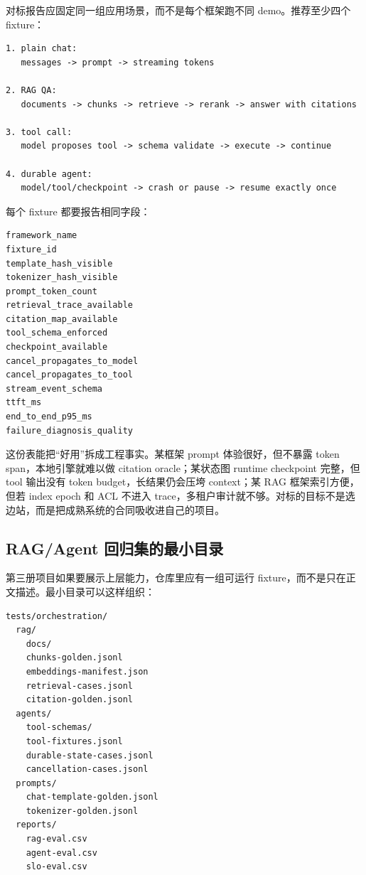 对标报告应固定同一组应用场景，而不是每个框架跑不同 demo。推荐至少四个 fixture：

\begin{lstlisting}[numbers=none,caption={上层框架对标 fixture}]
1. plain chat:
   messages -> prompt -> streaming tokens

2. RAG QA:
   documents -> chunks -> retrieve -> rerank -> answer with citations

3. tool call:
   model proposes tool -> schema validate -> execute -> continue

4. durable agent:
   model/tool/checkpoint -> crash or pause -> resume exactly once
\end{lstlisting}

每个 fixture 都要报告相同字段：

\begin{lstlisting}[numbers=none,caption={UpperFrameworkComparisonReport}]
framework_name
fixture_id
template_hash_visible
tokenizer_hash_visible
prompt_token_count
retrieval_trace_available
citation_map_available
tool_schema_enforced
checkpoint_available
cancel_propagates_to_model
cancel_propagates_to_tool
stream_event_schema
ttft_ms
end_to_end_p95_ms
failure_diagnosis_quality
\end{lstlisting}

这份表能把“好用”拆成工程事实。某框架 prompt 体验很好，但不暴露 token span，本地引擎就难以做 citation oracle；某状态图 runtime checkpoint 完整，但 tool 输出没有 token budget，长结果仍会压垮 context；某 RAG 框架索引方便，但若 index epoch 和 ACL 不进入 trace，多租户审计就不够。对标的目标不是选边站，而是把成熟系统的合同吸收进自己的项目。

\subsection{RAG/Agent 回归集的最小目录}

第三册项目如果要展示上层能力，仓库里应有一组可运行 fixture，而不是只在正文描述。最小目录可以这样组织：

\begin{lstlisting}[numbers=none,caption={上层回归集目录结构}]
tests/orchestration/
  rag/
    docs/
    chunks-golden.jsonl
    embeddings-manifest.json
    retrieval-cases.jsonl
    citation-golden.jsonl
  agents/
    tool-schemas/
    tool-fixtures.jsonl
    durable-state-cases.jsonl
    cancellation-cases.jsonl
  prompts/
    chat-template-golden.jsonl
    tokenizer-golden.jsonl
  reports/
    rag-eval.csv
    agent-eval.csv
    slo-eval.csv
\end{lstlisting}

